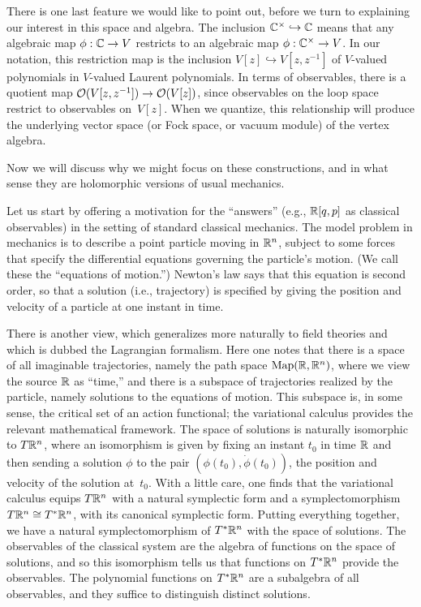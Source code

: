 \documentclass[11pt]{amsart}
\begin{document}
There is one last feature we would like to point out, before we turn to explaining our interest in this space and algebra.
The inclusion $\mathbb C^\times \hookrightarrow \mathbb C$ means that any algebraic map  $\phi: \mathbb C \to V$ restricts to an algebraic map $\phi: \mathbb C^\times \to V$.
In our notation, this restriction map is the inclusion $V[z] \hookrightarrow V[z,z^{-1}]$ of $V$-valued polynomials in $V$-valued Laurent polynomials.
In terms of observables, there is a quotient map $\mathcal O(V[z,z^{-1}]) \to \mathcal O(V[z])$, since observables on the loop space restrict to observables on~$V[z]$.
When we quantize, this relationship will produce the underlying vector space (or Fock space, or vacuum module) of the vertex algebra.

Now we will discuss why we might focus on these constructions,
and in what sense they are holomorphic versions of usual mechanics.

Let us start by offering a motivation for the ``answers'' (e.g., $\mathbb R[q,p]$ as classical observables) in the setting of standard classical mechanics.
The model problem in mechanics is to describe a point particle moving in $\mathbb R^n$,
subject to some forces that specify the differential equations governing the particle's motion.
(We call these the ``equations of motion.'')
Newton's law says that this equation is second order, so that a solution (i.e., trajectory) is specified by giving the position and velocity of a particle at one instant in time.

There is another view, which generalizes more naturally to field theories and which is dubbed the Lagrangian formalism.
Here one notes that there is a space of all imaginable trajectories, namely the path space ${\rm Map}(\mathbb R, \mathbb R^n)$, where we view the source $\mathbb R$ as ``time,''
and there is a subspace of trajectories realized by the particle, namely solutions to the equations of motion.
This subspace is, in some sense, the critical set of an action functional; 
the variational calculus provides the relevant mathematical framework.
The space of solutions is naturally isomorphic to $T \mathbb R^n$,
where an isomorphism is given by fixing an instant $t_0$ in time $\mathbb R$ and then sending a solution $\phi$ to the pair $(\phi(t_0), \dot{\phi}(t_0))$, the position and velocity of the solution at~$t_0$.
With a little care, one finds that the variational calculus equips $T \mathbb R^n$ with a natural symplectic form and a symplectomorphism $T\mathbb R^n \cong T^* \mathbb R^n$, with its canonical symplectic form. 
Putting everything together, we have a natural symplectomorphism of $T^* \mathbb R^n$ with the space of solutions.
The observables of the classical system are the algebra of functions on the space of solutions,
and so this isomorphism tells us that functions on $T^* \mathbb R^n$ provide the observables.
The polynomial functions on $T^* \mathbb R^n$ are a subalgebra of all observables, 
and they suffice to distinguish distinct solutions.
\end{document}
